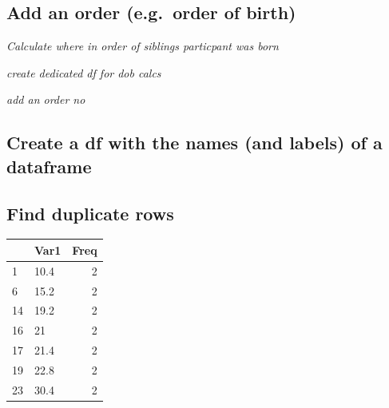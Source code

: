 \documentclass[
]{article}
\newenvironment{Shaded}{\begin{snugshade}}{\end{snugshade}}
\newcommand{\AttributeTok}[1]{\textcolor[rgb]{0.77,0.63,0.00}{#1}}
\newcommand{\CommentTok}[1]{\textcolor[rgb]{0.56,0.35,0.01}{\textit{#1}}}
\newcommand{\DecValTok}[1]{\textcolor[rgb]{0.00,0.00,0.81}{#1}}
\newcommand{\FunctionTok}[1]{\textcolor[rgb]{0.00,0.00,0.00}{#1}}
\newcommand{\NormalTok}[1]{#1}
\newcommand{\OtherTok}[1]{\textcolor[rgb]{0.56,0.35,0.01}{#1}}
\newcommand{\SpecialCharTok}[1]{\textcolor[rgb]{0.00,0.00,0.00}{#1}}
\begin{document}
\hypertarget{add-an-order-e.g.-order-of-birth}{%
\subsection{Add an order (e.g.~order of birth)}\label{add-an-order-e.g.-order-of-birth}}

\emph{Calculate where in order of siblings particpant was born}

\emph{create dedicated df for dob calcs}

\emph{add an order no}

\hypertarget{create-a-df-with-the-names-and-labels-of-a-dataframe}{%
\subsection{Create a df with the names (and labels) of a dataframe}\label{create-a-df-with-the-names-and-labels-of-a-dataframe}}

\hypertarget{find-duplicate-rows}{%
\subsection{Find duplicate rows}\label{find-duplicate-rows}}

\begin{Shaded}
\end{Shaded}

\begin{table}
\centering
\begin{tabular}{l|l|r}
\hline
  & Var1 & Freq\\
\hline
1 & 10.4 & 2\\
\hline
6 & 15.2 & 2\\
\hline
14 & 19.2 & 2\\
\hline
16 & 21 & 2\\
\hline
17 & 21.4 & 2\\
\hline
19 & 22.8 & 2\\
\hline
23 & 30.4 & 2\\
\hline
\end{tabular}
\end{table}
\end{document}
